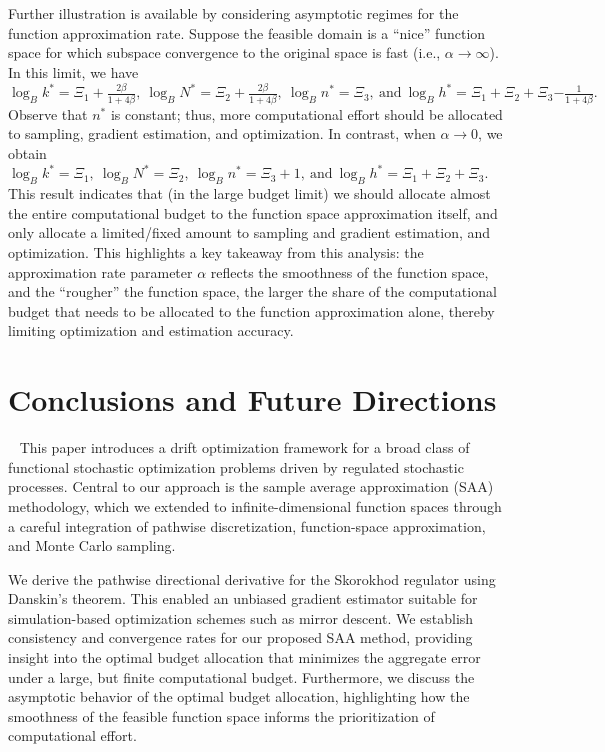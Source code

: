 \documentclass[11pt,leqno]{amsart}
\begin{document}
Further illustration is available by considering asymptotic regimes for the function approximation rate. Suppose the feasible domain is a “nice” function space for which subspace convergence to the original space is fast (i.e., $\alpha\rightarrow\infty$). In this limit, we have
\(
\log_B k^* = \Xi_1 + {\frac{2\beta}{1+4\beta}},~
\log_B N^* = \Xi_2 + {\frac{2\beta}{1+4\beta}},~
\log_B n^* = \Xi_3,~\text{and}~
\log_B h^* = \Xi_1+\Xi_2+\Xi_3 {-\frac{1}{1+4\beta}}.
\)
Observe that $n^*$ is constant; thus, more computational effort should be allocated to sampling, gradient estimation, and optimization. In contrast, when $\alpha\to 0$,  we obtain
\(
\log_B k^* = \Xi_1,~
\log_B N^* = \Xi_2,~
\log_B n^* = \Xi_3 + {1},~\text{and}~   
\log_B h^* = \Xi_1+\Xi_2+\Xi_3.
\)
This result indicates that (in the large budget limit) we should allocate almost the entire computational budget to the function space approximation itself, and only allocate a limited/fixed amount to sampling and gradient estimation, and optimization. This highlights a key takeaway from this analysis: the approximation rate parameter $\alpha$ reflects the smoothness of the function space, and the ``rougher'' the function space, the larger the share of the computational budget that needs to be allocated to the function approximation alone, thereby limiting optimization and estimation accuracy. 

\section{Conclusions and Future Directions}~\label{sec:conc}
This paper introduces a drift optimization framework for a broad class of functional stochastic optimization problems driven by regulated stochastic processes. Central to our approach is the sample average approximation (SAA) methodology, which we extended to infinite-dimensional function spaces through a careful integration of pathwise discretization, function-space approximation, and Monte Carlo sampling.

We derive the pathwise directional derivative for the Skorokhod regulator using Danskin’s theorem. This enabled an unbiased gradient estimator suitable for simulation-based optimization schemes such as mirror descent. We establish consistency and convergence rates for our proposed SAA method, providing insight into the optimal budget allocation that minimizes the aggregate error under a large, but finite computational budget. Furthermore, we discuss the asymptotic behavior of the optimal budget allocation, highlighting how the smoothness of the feasible function space informs the prioritization of computational effort.
\end{document}
